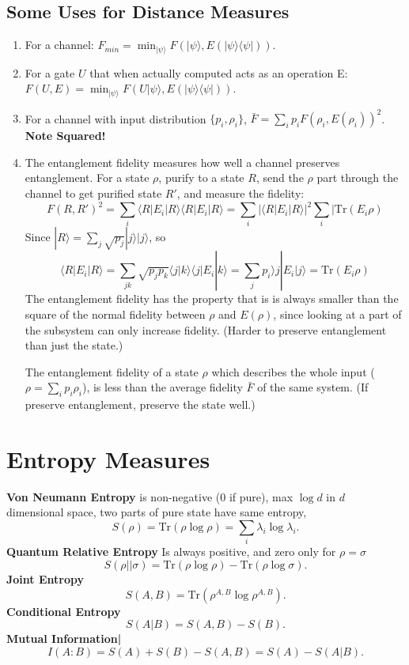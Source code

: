 \documentclass[12pt]{article}
\begin{document}
\subsection{Some Uses for Distance Measures}
\begin{enumerate}
\item For a channel: $F_{min}=\min_{|\psi\rangle}F(|\psi\rangle, E(|\psi\rangle\langle\psi|))$.
\item For a gate $U$ that when actually computed acts as an operation E: $F(U, E)=\min_{|\psi\rangle}F(U|\psi\rangle, E(|\psi\rangle\langle\psi|))$.
\item For a channel with input distribution $\{p_i, \rho_i\}$, $\bar{F}=\sum_ip_iF(\rho_i, E(\rho_i))^2$. {\bf{Note Squared!}}
\item The entanglement fidelity measures how well a channel preserves entanglement. For a state $\rho$, purify to a state $R$, send the $\rho$
part through the channel to get purified state $R'$, and measure the fidelity: 
$$F(R, R')^2=\sum_i\langle R|E_i| R\rangle\langle R|E_i |R\rangle=\sum_i|\langle R|E_i|R\rangle|^2\sum_i|\text{Tr}(E_i\rho)$$
Since $|R\rangle=\sum_j\sqrt{p_j}|j\rangle|j\rangle$, so
$$\langle R|E_i|R\rangle=\sum_{jk}\sqrt{p_jp_k}\langle j|k\rangle\langle j |E_i|k\rangle=\sum_jp_i\rangle j|E_i|j\rangle=\text{Tr}(E_i\rho)$$
The entanglement fidelity has the property that is is always smaller than the square of the normal fidelity between $\rho$ and $E(\rho)$,
since looking at a part of the subsystem can only increase fidelity. (Harder to preserve entanglement than just the state.)

The entanglement fidelity of a state $\rho$ which describes the whole input ($\rho=\sum_ip_i\rho_i$), is less than the average fidelity $\bar{F}$ of the same system. (If preserve entanglement, preserve the state well.)
\end{enumerate}

\section{Entropy Measures}
{\bf{Von Neumann Entropy}} is non-negative (0 if pure), max $\log d$ in $d$ dimensional space, two parts of pure state have same
entropy,
$$S(\rho)=\text{Tr}(\rho\log\rho)=\sum_i\lambda_i\log\lambda_i.$$
{\bf{Quantum Relative Entropy}} Is always positive, and zero only for $\rho=\sigma$
$$S(\rho||\sigma)=\text{Tr}(\rho\log\rho)-\text{Tr}(\rho\log\sigma).$$
{\bf{Joint Entropy}}
$$S(A,B)=\text{Tr}(\rho^{A,B}\log\rho^{A,B}).$$
{\bf Conditional Entropy}
$$S(A|B)=S(A,B)-S(B).$$
{\bf Mutual Information|}
$$I(A:B)=S(A)+S(B)-S(A,B)=S(A)-S(A|B).$$
\end{document}
